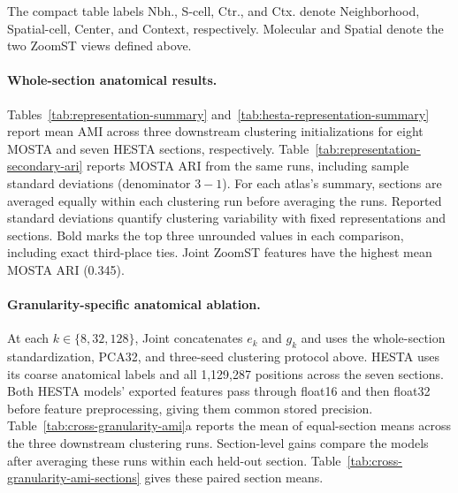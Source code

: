 The compact table labels Nbh., S-cell, Ctr., and Ctx. denote Neighborhood, Spatial-cell, Center, and Context, respectively. Molecular and Spatial denote the two ZoomST views defined above.

\paragraph{Whole-section anatomical results.}
Tables~\ref{tab:representation-summary} and~\ref{tab:hesta-representation-summary} report mean AMI across three downstream clustering initializations for eight MOSTA and seven HESTA sections, respectively. Table~\ref{tab:representation-secondary-ari} reports MOSTA ARI from the same runs, including sample standard deviations (denominator $3-1$). For each atlas's summary, sections are averaged equally within each clustering run before averaging the runs. Reported standard deviations quantify clustering variability with fixed representations and sections. Bold marks the top three unrounded values in each comparison, including exact third-place ties. Joint ZoomST features have the highest mean MOSTA ARI (0.345).

\begin{table}[t]
\centering\small
\caption{\textbf{ARI on all eight held-out sections.} Methods, positions, class sets, and clustering seeds match Table~\ref{tab:representation-summary}. Values are mean $\pm$ sample SD over downstream clustering initializations; the last row first averages sections equally within each seed. Bold marks the top three unrounded values per row, including third-place ties.}
\label{tab:representation-secondary-ari}
\setlength{\tabcolsep}{2.4pt}
\renewcommand{\arraystretch}{1.05}

\end{table}

\paragraph{Granularity-specific anatomical ablation.}
At each $k\in\{8,32,128\}$, Joint concatenates $e_k$ and $g_k$ and uses the whole-section standardization, PCA32, and three-seed clustering protocol above. HESTA uses its coarse anatomical labels and all 1,129,287 positions across the seven sections. Both HESTA models' exported features pass through float16 and then float32 before feature preprocessing, giving them common stored precision. Table~\ref{tab:cross-granularity-ami}a reports the mean of equal-section means across the three downstream clustering runs. Section-level gains compare the models after averaging these runs within each held-out section. Table~\ref{tab:cross-granularity-ami-sections} gives these paired section means.

